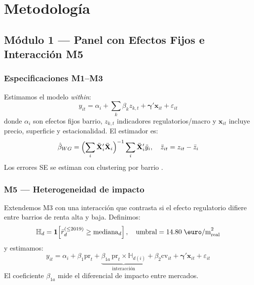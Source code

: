 \documentclass[10pt,a4paper,twocolumn]{article}
\begin{document}
\section{Metodología}
\label{sec:metodos}

\subsection{Módulo 1 — Panel con Efectos Fijos e Interacción M5}

\subsubsection{Especificaciones M1--M3}

Estimamos el modelo \textit{within}:
\begin{equation}
  y_{it} = \alpha_i + \sum_k \beta_k z_{k,t}
         + \boldsymbol{\gamma}'\mathbf{x}_{it} + \varepsilon_{it}
  \label{eq:panel}
\end{equation}
donde $\alpha_i$ son efectos fijos barrio, $z_{k,t}$ indicadores regulatorios/macro
y $\mathbf{x}_{it}$ incluye precio, superficie y estacionalidad. El estimador es:
\begin{equation}
  \hat{\beta}_{WG}
  = \Bigl(\sum_i \ddot{\mathbf{X}}_i'\ddot{\mathbf{X}}_i\Bigr)^{-1}
    \sum_i \ddot{\mathbf{X}}_i'\ddot{y}_i, \quad
  \ddot{z}_{it} = z_{it} - \bar{z}_i
  \label{eq:within}
\end{equation}
Los errores SE se estiman con clustering por barrio \citep{baltagi2021econometric}.

\subsubsection{M5 — Heterogeneidad de impacto}

Extendemos M3 con una interacción que contrasta si el efecto regulatorio difiere
entre barrios de renta alta y baja. Definimos:
\begin{equation}
  \mathbb{H}_d = \mathbf{1}\!\left[\bar{r}_d^{(\leq 2019)} \geq
  \text{mediana}_d\right], \quad
  \text{umbral} = 14.80\;\text{\euro/m}^2_\text{real}
  \label{eq:rentaalta}
\end{equation}
y estimamos:
\begin{equation}
  y_{it} = \alpha_i + \beta_1\text{pr}_t
  + \underbrace{\beta_{1a}\,\text{pr}_t \times \mathbb{H}_{d(i)}}_{\text{interacción}}
  + \beta_2\text{cv}_{it} + \boldsymbol{\gamma}'\mathbf{x}_{it} + \varepsilon_{it}
  \label{eq:m5}
\end{equation}
El coeficiente $\beta_{1a}$ mide el diferencial de impacto entre mercados.
\end{document}
